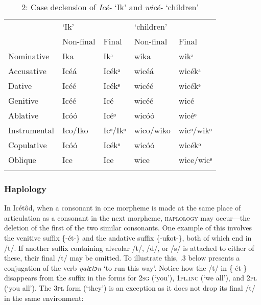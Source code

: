 \begin{table}
\caption{2: Case declension of \textit{Icé-} ‘Ik’ and \textit{wicé-} ‘children’}
\label{tab:2}


\begin{tabularx}{\textwidth}{XXXXX} & \multicolumn{2}{X}{‘Ik’} & \multicolumn{2}{X}{‘children’}\\
\lsptoprule
& Non-final & Final & Non-final & Final\\
Nominative & Ika & Ikᵃ & wika & wikᵃ\\
Accusative & Icéá & Icékᵃ & wicéá & wicékᵃ\\
Dative & Icéé & Icékᵉ & wicéé & wicékᵉ\\
Genitive & Icéé & Icé & wicéé & wicé\\
Ablative & Icóó & Icéᵒ & wicóó & wicéᵒ\\
Instrumental & Ico/Iko & Icᵒ/Ikᵒ & wico/wiko & wicᵒ/wikᵒ\\
Copulative & Icóó & Icékᵒ & wicóó & wicékᵒ\\
Oblique & Ice & Ice & wice & wice/wicᵉ\\
\lspbottomrule
\end{tabularx}
\end{table}


\subsubsection{Haplology}

In Icétôd, when a consonant in one morpheme is made at the same place of articulation as a consonant in the next morpheme, \textsc{haplology} may occur—the deletion of the first of the two similar consonants. One example of this involves the venitive\textsc{} suffix \{-ét-\} and the andative\textsc{} suffix \{-uƙot-\}, both of which end in /t/. If another suffix containing alveolar /t/, /d/, or /s/ is attached to either of these, their final /t/ may be omitted. To illustrate this, .3 below presents a conjugation of the verb \textit{ŋatɛtɔn} ‘to run this way’. Notice how the /t/ in \{-ét-\} disappears from the suffix in the forms for \textsc{2sg} (‘you’), \textsc{1pl.inc} (‘we all’), and \textsc{2pl} (‘you all’). The 3\textsc{pl} form (‘they’) is an exception as it does not drop its final /t/ in the same environment:


